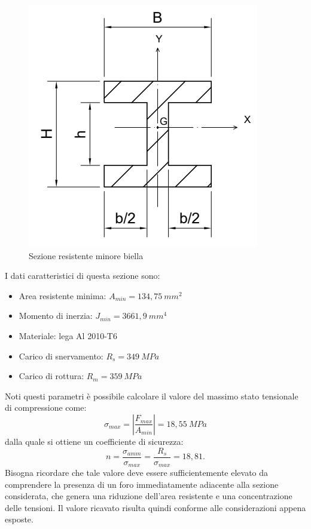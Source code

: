 \begin{figure}[h]
    \includegraphics[scale=0.6]{Immagini/SezioneMinoreBiella2.png}
    \caption{Sezione resistente minore biella }
    \label{fig:SezioneMinoreBiella}
\end{figure}
I dati caratteristici di questa sezione sono:
\begin{itemize}
    \item Area resistente minima: $A_{min}=134,75\ mm^2$
    \item Momento di inerzia: $J_{min}=3661,9\ mm^4$
    \item Materiale: lega Al 2010-T6
    \item Carico di snervamento: $R_s=349\ MPa$
    \item Carico di rottura: $R_m=359\ MPa$
\end{itemize}
Noti questi parametri è possibile calcolare il valore del massimo stato tensionale di compressione come:
\begin{equation}
    \sigma_{max}=\left|\frac{F_{max}}{A_{min}}\right|=18,55\ MPa
\end{equation}
dalla quale si ottiene un coefficiente di sicurezza:
\begin{equation}
    n=\frac{\sigma_{amm}}{\sigma_{max}}=\frac{R_s}{\sigma_{max}}=18,81.
\end{equation}
Bisogna ricordare che tale valore deve essere sufficientemente elevato da comprendere la presenza di un foro immediatamente adiacente alla sezione considerata, che genera una riduzione dell'area resistente e una concentrazione delle tensioni. Il valore ricavato risulta quindi conforme alle considerazioni appena esposte. 
